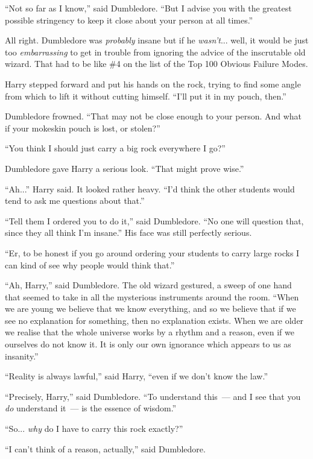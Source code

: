 ``Not so far as I know,'' said Dumbledore. ``But I advise you with the greatest possible stringency to keep it close about your person at all times.''

All right. Dumbledore was \emph{probably} insane but if he \emph{wasn't}... well, it would be just too \emph{embarrassing} to get in trouble from ignoring the advice of the inscrutable old wizard. That had to be like \#4 on the list of the Top 100 Obvious Failure Modes.

Harry stepped forward and put his hands on the rock, trying to find some angle from which to lift it without cutting himself. ``I'll put it in my pouch, then.''

Dumbledore frowned. ``That may not be close enough to your person. And what if your mokeskin pouch is lost, or stolen?''

``You think I should just carry a big rock everywhere I go?''

Dumbledore gave Harry a serious look. ``That might prove wise.''

``Ah...'' Harry said. It looked rather heavy. ``I'd think the other students would tend to ask me questions about that.''

``Tell them I ordered you to do it,'' said Dumbledore. ``No one will question that, since they all think I'm insane.'' His face was still perfectly serious.

``Er, to be honest if you go around ordering your students to carry large rocks I can kind of see why people would think that.''

``Ah, Harry,'' said Dumbledore. The old wizard gestured, a sweep of one hand that seemed to take in all the mysterious instruments around the room. ``When we are young we believe that we know everything, and so we believe that if we see no explanation for something, then no explanation exists. When we are older we realise that the whole universe works by a rhythm and a reason, even if we ourselves do not know it. It is only our own ignorance which appears to us as insanity.''

``Reality is always lawful,'' said Harry, ``even if we don't know the law.''

``Precisely, Harry,'' said Dumbledore. ``To understand this~--- and I see that you \emph{do} understand it~--- is the essence of wisdom.''

``So... \emph{why} do I have to carry this rock exactly?''

``I can't think of a reason, actually,'' said Dumbledore.

